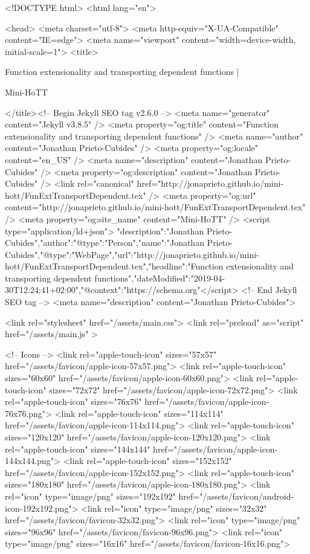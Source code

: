 <!DOCTYPE html>
<html lang="en">

<head>
  <meta charset="utf-8">
  <meta http-equiv="X-UA-Compatible" content="IE=edge">
  <meta name="viewport" content="width=device-width, initial-scale=1">
  <title>
    
      
        Function extensionality and transporting dependent functions  |
      
        Mini-HoTT
    
  </title><!-- Begin Jekyll SEO tag v2.6.0 -->
<meta name="generator" content="Jekyll v3.8.5" />
<meta property="og:title" content="Function extensionality and transporting dependent functions" />
<meta name="author" content="Jonathan Prieto-Cubides" />
<meta property="og:locale" content="en_US" />
<meta name="description" content="Jonathan Prieto-Cubides" />
<meta property="og:description" content="Jonathan Prieto-Cubides" />
<link rel="canonical" href="http://jonaprieto.github.io/mini-hott/FunExtTransportDependent.tex" />
<meta property="og:url" content="http://jonaprieto.github.io/mini-hott/FunExtTransportDependent.tex" />
<meta property="og:site_name" content="Mini-HoTT" />
<script type="application/ld+json">
{"description":"Jonathan Prieto-Cubides","author":{"@type":"Person","name":"Jonathan Prieto-Cubides"},"@type":"WebPage","url":"http://jonaprieto.github.io/mini-hott/FunExtTransportDependent.tex","headline":"Function extensionality and transporting dependent functions","dateModified":"2019-04-30T12:24:41+02:00","@context":"https://schema.org"}</script>
<!-- End Jekyll SEO tag -->
<meta name="description" content="Jonathan Prieto-Cubides">

  <link rel="stylesheet" href="/assets/main.css">
  <link rel="preload" as="script" href="/assets/main.js" >

  <!-- Icons -->
  <link rel="apple-touch-icon" sizes="57x57" href="/assets/favicon/apple-icon-57x57.png">
  <link rel="apple-touch-icon" sizes="60x60" href="/assets/favicon/apple-icon-60x60.png">
  <link rel="apple-touch-icon" sizes="72x72" href="/assets/favicon/apple-icon-72x72.png">
  <link rel="apple-touch-icon" sizes="76x76" href="/assets/favicon/apple-icon-76x76.png">
  <link rel="apple-touch-icon" sizes="114x114" href="/assets/favicon/apple-icon-114x114.png">
  <link rel="apple-touch-icon" sizes="120x120" href="/assets/favicon/apple-icon-120x120.png">
  <link rel="apple-touch-icon" sizes="144x144" href="/assets/favicon/apple-icon-144x144.png">
  <link rel="apple-touch-icon" sizes="152x152" href="/assets/favicon/apple-icon-152x152.png">
  <link rel="apple-touch-icon" sizes="180x180" href="/assets/favicon/apple-icon-180x180.png">
  <link rel="icon" type="image/png" sizes="192x192"  href="/assets/favicon/android-icon-192x192.png">
  <link rel="icon" type="image/png" sizes="32x32" href="/assets/favicon/favicon-32x32.png">
  <link rel="icon" type="image/png" sizes="96x96" href="/assets/favicon/favicon-96x96.png">
  <link rel="icon" type="image/png" sizes="16x16" href="/assets/favicon/favicon-16x16.png">

